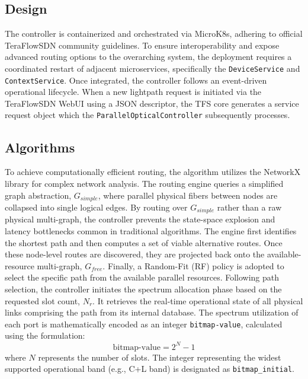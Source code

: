 \documentclass[conference]{IEEEtran}
\begin{document}
\subsection{Design} %

The controller is containerized and orchestrated via MicroK8s, adhering to official TeraFlowSDN community guidelines. To ensure interoperability and expose advanced routing options to the overarching system, the deployment requires a coordinated restart of adjacent microservices, specifically the \texttt{DeviceService} and \texttt{ContextService}. Once integrated, the controller follows an event-driven operational lifecycle. When a new lightpath request is initiated via the TeraFlowSDN WebUI using a JSON descriptor, the TFS core generates a service request object which the \texttt{ParallelOpticalController} subsequently processes.
\subsection{Algorithms}

To achieve computationally efficient routing, the algorithm utilizes the NetworkX library for complex network analysis. The routing engine queries a simplified graph abstraction, $G_{simple}$, where parallel physical fibers between nodes are collapsed into single logical edges. By routing over $G_{simple}$ rather than a raw physical multi-graph, the controller prevents the state-space explosion and latency bottlenecks common in traditional algorithms. The engine first identifies the shortest path and then computes a set of viable alternative routes. Once these node-level routes are discovered, they are projected back onto the available-resource multi-graph, $G_{free}$. Finally, a Random-Fit (RF) policy is adopted to select the specific path from the available parallel resources.
Following path selection, the controller initiates the spectrum allocation phase based on the requested slot count, $N_r$. It retrieves the real-time operational state of all physical links comprising the path from its internal database. The spectrum utilization of each port is mathematically encoded as an integer \texttt{bitmap-value}, calculated using the formulation:
\[
    \text{bitmap-value} = 2^N - 1
\]
where $N$ represents the number of slots. The integer representing the widest supported operational band (e.g., C+L band) is designated as \texttt{bitmap\_initial}.
\end{document}
